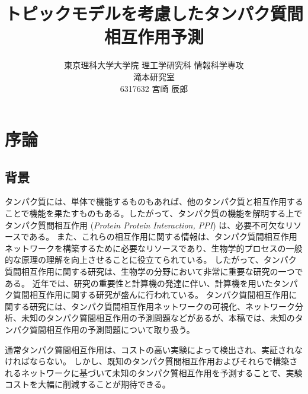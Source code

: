 \documentclass[titlepage,12pt]{jreport}
\title{トピックモデルを考慮したタンパク質間相互作用予測}
\author{
東京理科大学大学院 理工学研究科 情報科学専攻\\
滝本研究室\\
6317632 宮崎 辰郎
}
\begin{document}
\maketitle
%

\tableofcontents


\chapter{序論\label{introduction}}
\section{背景}
タンパク質には、単体で機能するものもあれば、他のタンパク質と相互作用することで機能を果たすものもある。したがって、タンパク質の機能を解明する上でタンパク質間相互作用 ({\it Protein Protein Interaction, PPI}) は、必要不可欠なリソースである。 また、これらの相互作用に関する情報は、タンパク質間相互作用ネットワークを構築するために必要なリソースであり、生物学的プロセスの一般的な原理の理解を向上させることに役立てられている\cite{ge03}。 したがって、タンパク質間相互作用に関する研究は、生物学の分野において非常に重要な研究の一つである。 近年では、研究の重要性と計算機の発達に伴い、計算機を用いたタンパク質間相互作用に関する研究が盛んに行われている。 タンパク質間相互作用に関する研究には、タンパク質間相互作用ネットワークの可視化\cite{iragne05}\cite{STRING17}、ネットワーク分析\cite{Bader2003}、未知のタンパク質間相互作用の予測問題\cite{Lei13}\cite{Tan14}\cite{Xu10}などがあるが、本稿では、未知のタンパク質間相互作用の予測問題について取り扱う。

通常タンパク質間相互作用は、コストの高い実験によって検出され、実証されなければならない。 しかし、既知のタンパク質間相互作用およびそれらで構築されるネットワークに基づいて未知のタンパク質相互作用を予測することで、実験コストを大幅に削減することが期待できる。 
\end{document}
